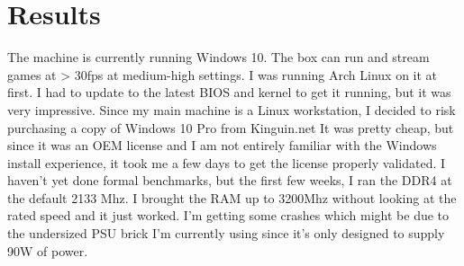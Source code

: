 \documentclass{article}
\begin{document}
\section{Results}
The machine is currently running Windows 10. The box can run and stream games at > 30fps at medium-high settings. I was running Arch Linux on it at first. I had to update to the latest BIOS and kernel to get it running, but it was very impressive. Since my main machine is a Linux workstation, I decided to risk purchasing a copy of Windows 10 Pro from Kinguin.net It was pretty cheap, but since it was an OEM license and I am not entirely familiar with the Windows install experience, it took me a few days to get the license properly validated. I haven't yet done formal benchmarks, but the first few weeks, I ran the DDR4 at the default 2133 Mhz. I brought the RAM up to 3200Mhz without looking at the rated speed and it just worked. I'm getting some crashes which might be due to the undersized PSU brick I'm currently using since it's only designed to supply 90W of power.

%
\end{document}

